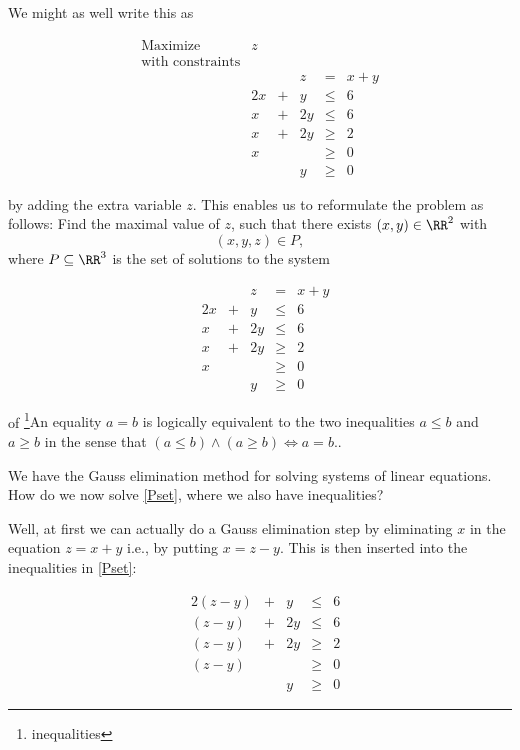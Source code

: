 \documentclass{article}
\begin{document}
We might as well write this as

$$
  \begin{array}{llrrrl}
    \text{Maximize} &z\\
    \text{with constraints}\\
    &&& z &= &x + y\\
    &2 x &+ &y &\leq &6\\
    &x &+ &2 y &\leq &6\\
    &x &+ &2 y &\geq &2\\
    &x &&&\geq &0\\
    &&&y &\geq &0
  \end{array}
$$
  
  by adding the extra variable $z$. This enables us to reformulate the problem as follows: Find
  the maximal value of $z$, such that there exists $(x, y)\in \RR^2$ with
  $$
  (x, y, z)\in P,
  $$
  where $P\subseteq \RR^3$ is the set of solutions to the system


\begin{equation}\label{Pset}

  \begin{array}{llrrrl}
    &&& z &= &x + y\\
    &2 x &+ &y &\leq &6\\
    &x &+ &2 y &\leq &6\\
    &x &+ &2 y &\geq &2\\
    &x &&&\geq &0\\
    &&&y &\geq &0
  \end{array}

\end{equation}
  


  of \footnote{inequalities}{An equality $a = b$ is logically equivalent to the two
    inequalities $a\leq b$ and $a \geq b$ in the sense that $(a\leq b) \wedge (a\geq b) \iff a = b$.}.

  We have the Gauss elimination method for solving systems of linear equations. How do we now solve
  \eqref{Pset}, where we also have inequalities?

  Well, at first we can actually do a Gauss elimination step by eliminating $x$ in the equation
  $z = x + y$ i.e., by putting $x = z - y$. This is then inserted into the inequalities in
  \eqref{Pset}:

$$
\begin{array}{llrrrl}
    &2 (z - y) &+ &y &\leq &6\\
    &(z - y) &+ &2 y &\leq &6\\
    &(z - y) &+ &2 y &\geq &2\\
    &(z - y) &  &    &\geq &0\\
    &          &  &  y &\geq &0
\end{array}
$$
\end{document}
